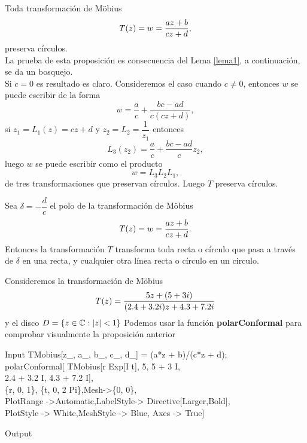 \begin{prop}
	Toda transformación de M\"obius 
	\begin{equation}\label{trmob}
		T(z)=w=\dfrac{az+b}{cz+d},
	\end{equation}
	preserva círculos.\\
	La prueba de esta proposición es consecuencia del Lema \ref{lema1}, a continuación, se da un bosquejo.\\
	Si $c=0$ es resultado es claro. Consideremos el caso cuando $c\neq0$, entonces $w$ se puede escribir de la forma 
	$$w=\dfrac{a}{c}+\dfrac{bc-ad}{c(cz+d)},$$
	si $z_1=L_1(z)=cz+d$ y $z_2=L_2=\dfrac{1}{z_1}$ entonces 
	$$L_3(z_2)=\dfrac{a}{c}+\dfrac{bc-ad}{c}z_2,$$
	luego $w$ se puede escribir como el producto $$w=L_3L_2L_1,$$ de tres transformaciones que preservan círculos. Luego $T$ preserva círculos.
\end{prop}
\begin{coro}
	Sea $\delta=-\dfrac{d}{c}$ el polo de la transformación de M\"obius $$T(z)=w=\dfrac{az+b}{cz+d}.$$ Entonces la transformación $T$ transforma toda recta o círculo que pasa a través de $\delta$ en una recta,  y cualquier otra línea recta o círculo en	un circulo.
\end{coro}
Consideremos la transformación de M\"obius $$T(z)=\dfrac{5z+(5+3i)}{(2.4+3.2i)z+{4.3+7.2i}}$$
y el disco $D=\{z\in \mathbb{C}: |z|< 1\}$
Podemos usar la función \textbf{polarConformal} para comprobar visualmente la proposición anterior
\begin{mmaCell}{Input}
	 TMobius[z_, a_, b_, c_, d_] = (a*z + b)/(c*z + d);\\polarConformal[ TMobius[r Exp[I t], 5, 5 + 3 I,\\2.4 + 3.2 I, 4.3 + 7.2 I],\\\{r, 0, 1\}, \{t, 0, 2 Pi\},Mesh->\{0, 0\},\\PlotRange ->Automatic,LabelStyle-> Directive[Larger,Bold],\\PlotStyle -> White,MeshStyle -> Blue, Axes -> True]
\end{mmaCell}
\begin{mmaCell}[moregraphics={moreig={scale=0.7}}]{Output}
\end{mmaCell}

